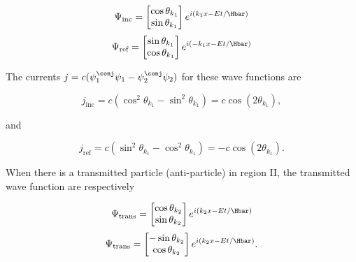 \begin{dmath}\label{eqn:gradQuantumProblemSet4Problem3:640}
\Psi_{\textrm{inc}} = 
\begin{bmatrix}
\cos\theta_{k_1} \\
\sin\theta_{k_1} \\
\end{bmatrix}
e^{i (k_1 x - E t/\Hbar)}
\end{dmath}
\begin{dmath}\label{eqn:gradQuantumProblemSet4Problem3:660}
\Psi_{\textrm{ref}} = 
\begin{bmatrix}
\sin\theta_{k_1} \\
\cos\theta_{k_1} \\
\end{bmatrix}
e^{i (-k_1 x - E t/\Hbar)}
\end{dmath}

The currents \( j = c (\psi_1^\conj \psi_1 - \psi_2^\conj \psi_2) \) for these wave functions are

\begin{equation}\label{eqn:gradQuantumProblemSet4Problem3:960}
j_{\textrm{inc}} = c (\cos^2 \theta_{k_1} - \sin^2 \theta_{k_1}) = c \cos(2 \theta_{k_1} ),
\end{equation}

and

\begin{equation}\label{eqn:gradQuantumProblemSet4Problem3:980}
j_{\textrm{ref}} = c (\sin^2 \theta_{k_1} - \cos^2 \theta_{k_1}) = -c \cos(2 \theta_{k_1} ).
\end{equation}

When there is a transmitted particle (anti-particle) in region II, the transmitted wave function are respectively

\begin{dmath}\label{eqn:gradQuantumProblemSet4Problem3:680}
\Psi_{\textrm{trans}} = 
\begin{bmatrix}
\cos\theta_{k_2} \\
\sin\theta_{k_2} \\
\end{bmatrix}
e^{i (k_2 x - E t/\Hbar)}
\end{dmath}
\begin{dmath}\label{eqn:gradQuantumProblemSet4Problem3:700}
\Psi_{\textrm{trans}} = 
\begin{bmatrix}
-\sin\theta_{k_2} \\
\cos\theta_{k_2} \\
\end{bmatrix}
e^{i (k_2 x - E t/\Hbar)}.
\end{dmath}

